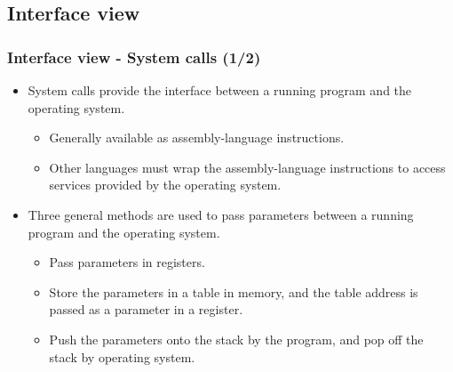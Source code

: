 \documentclass[CJKutf8,dvipsnames,table]{beamer}
\begin{document}
\begin{CJK*}{UTF8}{song}
  \subsection{Interface view}

  \begin{frame}
    \frametitle{Interface view - System calls (1/2)} \pause
    \begin{itemize}
    \item System calls provide the interface between a running program and the operating system.  \pause
      \begin{itemize}
      \item Generally available as assembly-language instructions.  \pause
      \item Other languages must wrap the assembly-language instructions to access services provided by the operating system.  \pause
      \end{itemize}
    \item Three general methods are used to pass parameters between a running program and the operating system.  \pause
      \begin{itemize}
      \item Pass parameters in registers.  \pause
      \item Store the parameters in a table in memory, and the table address is passed as a parameter in a register.  \pause
      \item Push the parameters onto the stack by the program, and pop off the stack by operating system. 
      \end{itemize}
    \end{itemize}
  \end{frame}


\end{CJK*}
\end{document}
